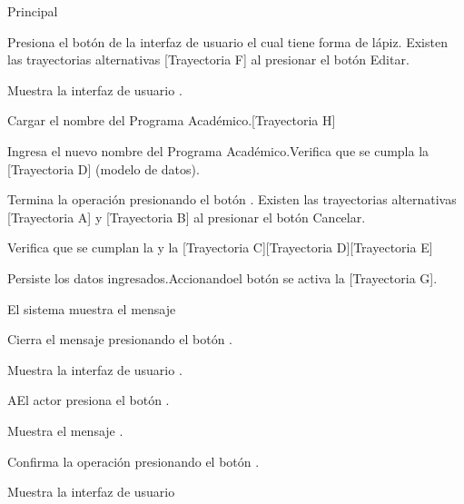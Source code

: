 
\begin{UCtrayectoria}{Principal}

    \UCpaso[\UCactor] Presiona el botón  de la interfaz de usuario  el cual tiene forma de lápiz. Existen las trayectorias alternativas [Trayectoria F] al presionar el botón Editar.

    \UCpaso Muestra la interfaz de usuario .

    \UCpaso Cargar el nombre del Programa Académico.[Trayectoria H]

    \UCpaso[\UCactor] Ingresa el nuevo nombre del Programa Académico.Verifica que se cumpla la [Trayectoria D] (modelo de datos).

    \UCpaso[\UCactor] Termina la operación presionando el botón . Existen las trayectorias alternativas [Trayectoria A] y [Trayectoria B] al presionar el botón Cancelar.

    \UCpaso Verifica que se cumplan la  y la  [Trayectoria C][Trayectoria D][Trayectoria E]

    \UCpaso Persiste los datos ingresados.Accionandoel botón  se activa la  [Trayectoria G].

    \UCpaso El sistema muestra el mensaje 

    \UCpaso[\UCactor] Cierra el mensaje presionando el botón .

    \UCpaso Muestra la interfaz de usuario .

\end{UCtrayectoria}


\begin{UCtrayectoriaA}{A}{El actor presiona el botón .}

    \UCpaso Muestra el mensaje .

    \UCpaso[\UCactor] Confirma la operación presionando el botón .

    \UCpaso Muestra la interfaz de usuario 

\end{UCtrayectoriaA}

